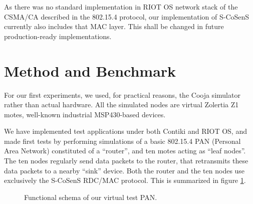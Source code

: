 \documentclass[conference]{IEEEtran}
\begin{document}
As there was no standard implementation in RIOT OS network stack of
the CSMA/CA described in the 802.15.4 protocol, our implementation of
S-CoSenS currently also includes that MAC layer. This shall be changed
in future production-ready implementations.



\section{Method and Benchmark}

For our first experiments, we used, for practical reasons, the Cooja
simulator rather than actual hardware. All the simulated nodes are
virtual Zolertia Z1 motes, well-known industrial MSP430-based devices.

We have implemented test applications under both Contiki and RIOT OS, and
made first tests by performing simulations of a basic 802.15.4 PAN
(Personal Area Network) constituted of a ``router'', and ten motes
acting as ``leaf nodes''. The ten nodes regularly send data packets to
the router, that retransmits these data packets to a nearby ``sink'' device.
Both the router and the ten nodes use exclusively the S-CoSenS RDC/MAC
protocol. This is summarized in figure \ref{FigPANtest}.

\begin{figure}[!h]
\centering
{}
\caption{Functional schema of our virtual test PAN.}
\label{FigPANtest}
\end{figure}
\end{document}
